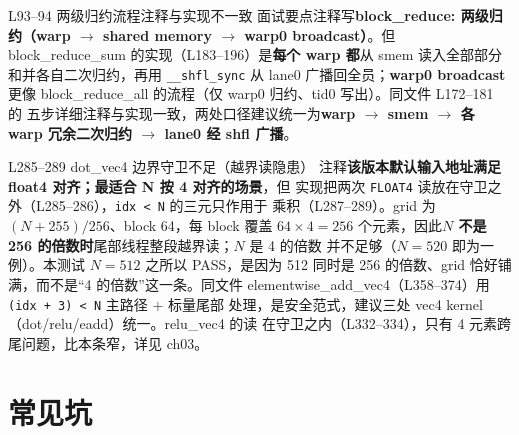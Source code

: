\begin{kaogu}[F1]{L93--94 两级归约流程注释与实现不一致}
面试要点注释写\textbf{block\_reduce: 两级归约（warp $\to$ shared memory $\to$
warp0 broadcast）}。但 block\_reduce\_sum 的实现（L183--196）是\textbf{每个
warp 都}从 smem 读入全部部分和并各自二次归约，再用
\texttt{\_\_shfl\_sync} 从 lane0 广播回全员；\textbf{warp0 broadcast}更像
block\_reduce\_all 的流程（仅 warp0 归约、tid0 写出）。同文件 L172--181 的
五步详细注释与实现一致，两处口径建议统一为\textbf{warp $\to$ smem $\to$ 各 warp
冗余二次归约 $\to$ lane0 经 shfl 广播}。
\end{kaogu}

\begin{kaogu}[F1]{L285--289 dot\_vec4 边界守卫不足（越界读隐患）}
注释\textbf{该版本默认输入地址满足 float4 对齐；最适合 N 按 4 对齐的场景}，但
实现把两次 \texttt{FLOAT4} 读放在守卫之外（L285--286），\texttt{idx < N} 的三元只作用于
乘积（L287--289）。grid 为 $(N+255)/256$、block 64，每 block 覆盖 $64\times4=256$
个元素，因此\textbf{$N$ 不是 256 的倍数时}尾部线程整段越界读；$N$ 是 4 的倍数
并不足够（$N = 520$ 即为一例）。本测试 $N = 512$ 之所以 PASS，是因为 512
同时是 256 的倍数、grid 恰好铺满，而不是“4 的倍数”这一条。同文件
elementwise\_add\_vec4（L358--374）用 \texttt{(idx + 3) < N} 主路径 + 标量尾部
处理，是安全范式，建议三处 vec4 kernel（dot/relu/eadd）统一。relu\_vec4 的读
在守卫之内（L332--334），只有 4 元素跨尾问题，比本条窄，详见 ch03。
\end{kaogu}

\section{常见坑}

